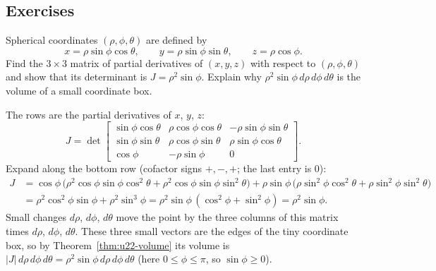 \subsection{Exercises}

\begin{exercise}\label{exr:u22-spherical}
Spherical coordinates $(\rho,\phi,\theta)$ are defined by
\[
  x=\rho\sin\phi\cos\theta,\qquad y=\rho\sin\phi\sin\theta,\qquad z=\rho\cos\phi .
\]
Find the $3\times3$ matrix of partial derivatives of $(x,y,z)$ with respect to
$(\rho,\phi,\theta)$ and show that its determinant is $J=\rho^{2}\sin\phi$. Explain why
$\rho^{2}\sin\phi\,d\rho\,d\phi\,d\theta$ is the volume of a small coordinate box.
\end{exercise}
\begin{solution}
The rows are the partial derivatives of $x$, $y$, $z$:
\[
  J=\det\begin{bmatrix}
  \sin\phi\cos\theta & \rho\cos\phi\cos\theta & -\rho\sin\phi\sin\theta\\
  \sin\phi\sin\theta & \rho\cos\phi\sin\theta & \rho\sin\phi\cos\theta\\
  \cos\phi & -\rho\sin\phi & 0
  \end{bmatrix}.
\]
Expand along the bottom row (cofactor signs $+,-,+$; the last entry is $0$):
\begin{align*}
J&=\cos\phi\,\bigl(\rho^{2}\cos\phi\sin\phi\cos^{2}\theta+\rho^{2}\cos\phi\sin\phi\sin^{2}\theta\bigr)
 +\rho\sin\phi\,\bigl(\rho\sin^{2}\phi\cos^{2}\theta+\rho\sin^{2}\phi\sin^{2}\theta\bigr)\\
&=\rho^{2}\cos^{2}\phi\sin\phi+\rho^{2}\sin^{3}\phi
 =\rho^{2}\sin\phi\,(\cos^{2}\phi+\sin^{2}\phi)=\rho^{2}\sin\phi .
\end{align*}
Small changes $d\rho$, $d\phi$, $d\theta$ move the point by the three columns of this matrix
times $d\rho$, $d\phi$, $d\theta$. These three small vectors are the edges of the tiny
coordinate box, so by Theorem~\ref{thm:u22-volume} its volume is
$|J|\,d\rho\,d\phi\,d\theta=\rho^{2}\sin\phi\,d\rho\,d\phi\,d\theta$ (here $0\le\phi\le\pi$, so
$\sin\phi\ge0$).
\end{solution}

